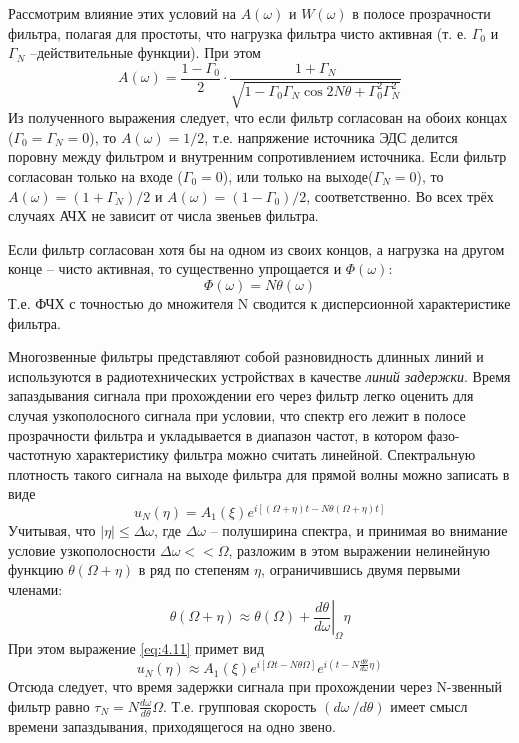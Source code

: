 Рассмотрим влияние этих условий на $A(\omega)$ и $W(\omega)$ в полосе прозрачности фильтра, полагая для простоты, что нагрузка фильтра чисто активная (т. е. $\Gamma_0$ и $\Gamma_N$ –действительные функции). При этом
\begin{equation}
\label{eq:4.9}
A(\omega)=\frac{1-\Gamma_0}{2}\cdot\frac{1+\Gamma_N}
{\sqrt{1-\Gamma_0\Gamma_N\cos2N\theta+\Gamma^2_0\Gamma^2_N}}
\end{equation}
Из полученного выражения следует, что если фильтр согласован на обоих концах ($\Gamma_0=\Gamma_N=0$), то $A(\omega)=1/2$, т.е. напряжение источника ЭДС делится поровну между фильтром и внутренним сопротивлением источника. Если фильтр согласован только на входе ($\Gamma_0=0$), или только на выходе($\Gamma_N=0$), то $A(\omega)=(1+\Gamma_N)/2$ и $A(\omega)=(1-\Gamma_0)/2$, соответственно. Во всех трёх случаях АЧХ не зависит от числа звеньев фильтра.
 
Если фильтр согласован хотя бы на одном из своих концов, а нагрузка на другом конце -- чисто активная, то существенно упрощается и $\Phi(\omega)$:
\begin{equation}
\label{eq:4.10}
\Phi(\omega)=N\theta(\omega)
\end{equation}
Т.е. ФЧХ с точностью до множителя N сводится к дисперсионной характеристике фильтра.

Многозвенные фильтры представляют собой разновидность длинных линий и используются в радиотехнических устройствах в качестве \textit{линий задержки}. Время запаздывания сигнала при прохождении его через фильтр легко оценить для случая узкополосного сигнала при условии, что спектр его лежит в полосе прозрачности фильтра и укладывается в диапазон частот, в котором фазо-частотную характеристику фильтра можно считать линейной. Спектральную плотность такого сигнала на выходе фильтра для прямой волны можно записать в виде
\begin{equation}
\label{eq:4.11}
u_N(\eta)=A_1(\xi)e^{i[(\Omega+\eta)t-N\theta(\Omega+\eta)t]}
\end{equation}
Учитывая, что $|\eta|\leq\Delta\omega$, где $\Delta\omega$ -- полуширина спектра, и принимая во внимание условие узкополосности $\Delta\omega<<\Omega$, разложим в этом выражении нелинейную функцию $\theta(\Omega+\eta)$ в ряд по степеням $\eta$, ограничившись двумя первыми членами:
\begin{equation}
\label{eq:4.12}
\theta(\Omega+\eta)\approx\theta(\Omega)+\left.\frac{d\theta}{d\omega}\right|_\Omega \eta
\end{equation}
При этом выражение \eqref{eq:4.11} примет вид
\begin{equation}
\label{eq:4.13}
u_N(\eta)\approx A_1(\xi)e^{i[\Omega t-N\theta\Omega]}e^{i(t-N\frac{d\theta}{d\omega}\eta)}
\end{equation}
Отсюда следует, что время задержки сигнала при прохождении через N-звенный фильтр равно $\tau_N=N\frac{d\omega}{d\theta} \Omega$. Т.е. групповая скорость $(d\omega\ /d\theta)$ имеет смысл времени запаздывания, приходящегося на одно звено.
